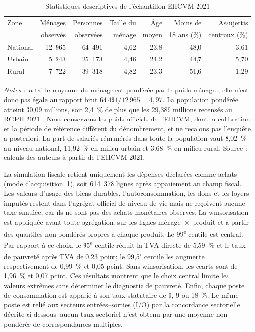 \documentclass[11pt,a4paper]{article}
\begin{document}
\begin{table}[t]
\centering
\begin{threeparttable}
\caption{Statistiques descriptives de l'échantillon EHCVM 2021}
\label{tab:descriptif}
\small
\begin{tabular}{lrrrrrr}
\toprule
Zone & Ménages & Personnes & Taille du & Âge & Moins de & Assujettis \\
 & observés & observées & ménage & moyen & 18 ans (\%) & centraux (\%) \\
\midrule
National & 12~965 & 64~491 & 4,62 & 23,8 & 48,0 & 3,61 \\
Urbain   &  5~243 & 25~173 & 4,46 & 24,2 & 44,7 & 5,70 \\
Rural    &  7~722 & 39~318 & 4,82 & 23,3 & 51,6 & 1,29 \\
\bottomrule
\end{tabular}
\begin{tablenotes}\footnotesize
\item \emph{Notes} : la taille moyenne du ménage est pondérée par le poids
ménage ; elle n'est donc pas égale au rapport brut $64\,491/12\,965=4,97$. La
population pondérée atteint 30,09 millions, soit 2,4~\% de plus que les
29,389 millions recensés au RGPH 2021 \citep{anstatRGPH2021}. Nous conservons les
poids officiels de l'EHCVM, dont la calibration et la période de référence
diffèrent du dénombrement, et ne recalons pas l'enquête a posteriori. La part de
salariés rémunérés dans toute la population vaut 8,02~\% au niveau national,
11,92~\% en milieu urbain et 3,68~\% en milieu rural. Source : calculs des
auteurs à partir de l'EHCVM 2021.
\end{tablenotes}
\end{threeparttable}
\end{table}

La simulation fiscale retient uniquement les dépenses déclarées comme achats
(mode d'acquisition~1), soit 614~378 lignes après appariement au champ fiscal.
Les valeurs d'usage des biens durables, l'autoconsommation, les dons et les
loyers imputés restent dans l'agrégat officiel de niveau de vie mais ne reçoivent
aucune taxe simulée, car ils ne sont pas des achats monétaires observés. La
winsorisation est appliquée avant toute agrégation, sur les lignes
ménage~$\times$~produit et à partir des quantiles non pondérés propres à chaque
produit. Le 99\textsuperscript{e} centile est central. Par rapport à ce choix, le
95\textsuperscript{e} centile réduit la TVA directe de 5,59~\% et le taux de
pauvreté après TVA de 0,23 point; le 99,5\textsuperscript{e} centile les augmente
respectivement de 0,99~\% et 0,05 point. Sans winsorisation, les écarts sont de
1,96~\% et 0,07 point. Ces résultats montrent que le choix central limite les
valeurs extrêmes sans déterminer le diagnostic de pauvreté. Enfin, chaque poste de consommation est
apparié à son taux statutaire de 0, 9 ou 18~\%. Le même poste est relié aux
secteurs entrées--sorties (I/O) par la concordance sectorielle décrite ci-dessous; aucun taux
sectoriel n'est obtenu par une moyenne non pondérée de correspondances multiples.
\end{document}
